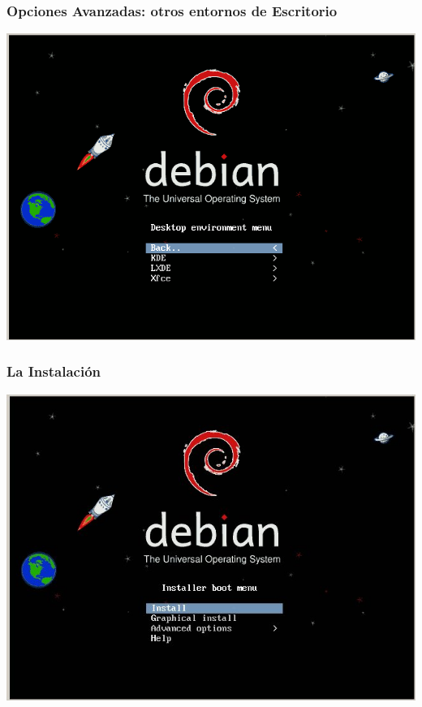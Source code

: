 \documentclass{beamer}
\begin{document}
\begin{frame}
\frametitle{Opciones Avanzadas: otros entornos de Escritorio}
\includegraphics[height=0.8\textheight]{./imgs/3_4_alternative_desktop.png} \hspace*{7.3cm}
\end{frame}

\begin{frame}
\frametitle{La Instalaci\'on}
\includegraphics[height=0.8\textheight]{./imgs/1_inicioCD.jpg} \hspace*{7.3cm}
\end{frame} 
\end{document}
